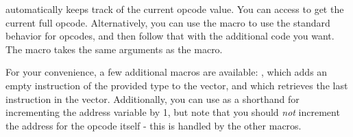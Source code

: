  automatically keeps track of the current opcode value. You can access  to get the current full opcode. Alternatively, you can use the  macro to use the standard behavior for opcodes, and then follow that with the additional code you want. The  macro takes the same arguments as the  macro.

For your convenience, a few additional macros are available: , which adds an empty instruction of the provided type to the vector, and  which retrieves the last instruction in the vector. Additionally, you can use  as a shorthand for incrementing the address variable by 1, but note that you should \emph{not} increment the address for the opcode itself - this is handled by the other macros.
